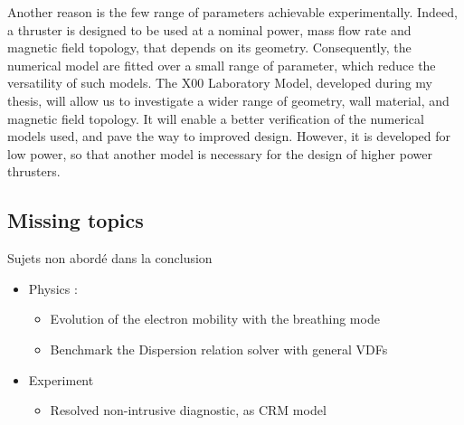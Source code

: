Another reason is the few range of parameters achievable experimentally.
Indeed, a thruster is designed to be used at a nominal power, mass flow rate and magnetic field topology, that depends on its geometry.
Consequently, the numerical model are fitted over a small range of parameter, which reduce the versatility of such models.
The \PPS X00 Laboratory Model, developed during my thesis, will allow us to investigate a wider range of geometry, wall material, and magnetic field topology.
It will enable a better verification of the numerical models used, and pave the way to improved design.
However, it is developed for low power, so that another model is necessary for the design of higher power thrusters. 


\subsection{Missing topics}
Sujets non abordé dans la conclusion



\begin{itemize}
  \item Physics :
  \begin{itemize}
    \item Evolution of the electron mobility with the breathing mode
    \item Benchmark the Dispersion relation solver with general VDFs
  \end{itemize}


  \item Experiment
  \begin{itemize}
    \item Resolved non-intrusive diagnostic, as CRM model
  \end{itemize}
  
  
\end{itemize}



